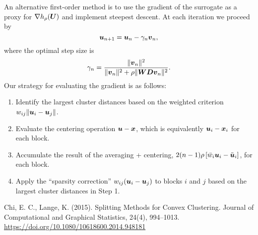 \documentclass[11pt]{article}
\begin{document}
An alternative first-order method is to use the gradient of the surrogate as a proxy for \(\nabla h_{\rho}(\boldsymbol{U})\) and implement steepest descent.
At each iteration we proceed by
\begin{equation*}
    \boldsymbol{u}_{n+1} = \boldsymbol{u}_{n} - \gamma_{n} \boldsymbol{v}_{n},
\end{equation*}
where the optimal step size is
\begin{equation*}
    \gamma_{n} = \frac{\|\boldsymbol{v}_{n}\|^{2}}{\|\boldsymbol{v}_{n}\|^{2} + \rho \|\boldsymbol{W} \boldsymbol{D} \boldsymbol{v}_{n}\|^{2}}.
\end{equation*}
Our strategy for evaluating the gradient is as follows:
\begin{enumerate}
    \item Identify the largest cluster distances based on the weighted criterion \(w_{ij} \| \boldsymbol{u}_{i} - \boldsymbol{u}_{j} \|\).
    
    \item Evaluate the centering operation \(\boldsymbol{u} - \boldsymbol{x}\), which is equivalently \(\boldsymbol{u}_{i} - \boldsymbol{x}_{i}\) for each block.
    
    \item Accumulate the result of the averaging + centering, \(2(n-1) \rho \left[\bar{w}_{i} \boldsymbol{u}_{i} - \tilde{\boldsymbol{u}}_{i}\right]\), for each block.
    
    \item Apply the ``sparsity correction'' \(w_{ij} (\boldsymbol{u}_{i} - \boldsymbol{u}_{j})\) to blocks \(i\) and \(j\) based on the largest cluster distances in Step 1.
\end{enumerate}

\begin{thebibliography}{1}
    Chi, E. C., Lange, K. (2015). {Splitting Methods for Convex Clustering}. {Journal of Computational and Graphical Statistics}, 24(4), 994–1013. \url{https://doi.org/10.1080/10618600.2014.948181}
\end{thebibliography}
\end{document}

